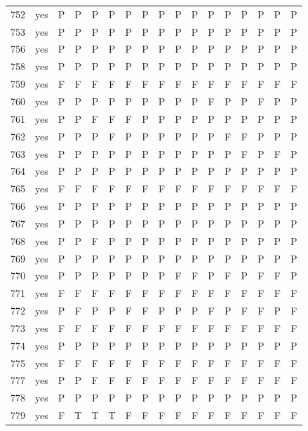 \begin{table}[p]
\begin{tabular*}{\textwidth}{@{\extracolsep{\fill}}rcccccccccccccccc}
752 & yes & P & P & P & P & P & P & P & P & P & P & P & P & P & P & P\\
753 & yes & P & P & P & P & P & P & P & P & P & P & P & P & P & P & P\\
756 & yes & P & P & P & P & P & P & P & P & P & P & P & P & P & P & P\\
758 & yes & P & P & P & P & P & P & P & P & P & P & P & P & P & P & P\\
759 & yes & F & F & F & F & F & F & F & F & F & F & F & F & F & F & F\\
760 & yes & P & P & P & P & P & P & P & P & P & F & P & P & F & P & P\\
761 & yes & P & P & F & F & F & P & P & P & P & P & P & P & P & P & P\\
762 & yes & P & P & P & F & P & P & P & P & P & P & F & F & P & P & P\\
763 & yes & P & P & P & P & P & P & P & P & P & P & P & F & P & F & P\\
764 & yes & P & P & P & P & P & P & P & P & P & P & P & P & P & P & P\\
765 & yes & F & F & F & F & F & F & F & F & F & F & F & F & F & F & F\\
766 & yes & P & P & P & P & P & P & P & P & P & P & P & P & P & P & P\\
767 & yes & P & P & P & P & P & P & P & P & P & P & P & P & P & P & P\\
768 & yes & P & P & F & P & P & P & P & P & P & P & P & P & P & P & P\\
769 & yes & P & P & P & P & P & P & P & P & P & P & P & P & P & P & P\\
770 & yes & P & P & P & P & P & P & P & F & F & P & F & P & F & F & P\\
771 & yes & F & F & F & F & F & F & F & F & F & F & F & F & F & F & F\\
772 & yes & P & F & P & P & F & F & P & P & P & F & P & F & F & P & F\\
773 & yes & F & F & F & F & F & F & F & F & F & F & F & F & F & F & F\\
774 & yes & P & P & P & P & P & P & P & P & P & P & P & P & P & P & P\\
775 & yes & F & F & F & F & F & F & F & F & F & F & F & F & F & F & F\\
777 & yes & P & P & F & F & F & F & F & F & F & F & F & F & F & F & F\\
778 & yes & P & P & P & P & P & P & P & P & P & P & P & P & P & P & P\\
779 & yes & F & T & T & T & F & F & F & F & F & F & F & F & F & F & F\\
\bottomrule\end{tabular*}\end{table}
\clearpage

